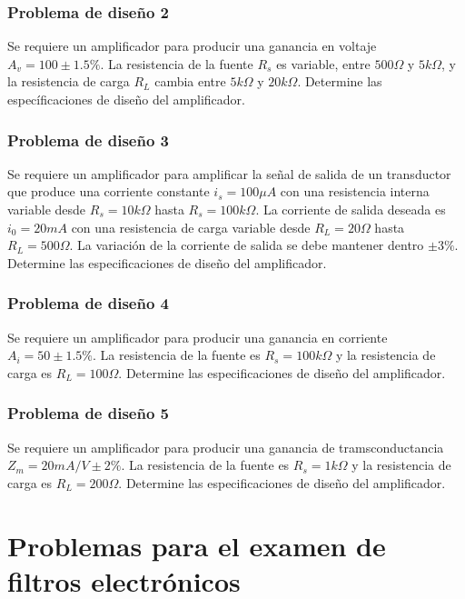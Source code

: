 \documentclass[12pt]{book}
\theoremstyle{definition}
\theoremstyle{remark}
\theoremstyle{plain}
\begin{document}
\subsubsection{Problema de diseño 2}

Se requiere un amplificador para producir una ganancia en voltaje $A_v =100 \pm 1.5 \%$. La resistencia de la fuente $R_s$ es variable, entre $500 \Omega$ y $5 k \Omega$, y la resistencia de carga $R_L$ cambia entre $5 k  \Omega$ y $20 k \Omega$. Determine las específicaciones de diseño del amplificador.

\subsubsection{Problema de diseño 3}

Se requiere un amplificador para amplificar la señal de salida de un transductor que produce una corriente constante $i_s = 100 \mu A$ con una resistencia interna variable desde $R_s=10 k \Omega$ hasta  $R_s=100 k \Omega$. La corriente de salida deseada es $i_0 = 20 mA$ con una resistencia de carga variable desde  $R_L=20 \Omega$ hasta  $R_L=500 \Omega$. La variación de la corriente de salida se debe mantener dentro $\pm 3 \%$. Determine las especificaciones de diseño del amplificador.


\subsubsection{Problema de diseño 4}

Se requiere un amplificador para producir una ganancia en corriente $A_i = 50 \pm 1.5 \%$. La resistencia de la fuente es $R_s=100 k \Omega$ y la resistencia de carga es $R_L= 100 \Omega$. Determine las especificaciones de diseño del amplificador.

\subsubsection{Problema de diseño 5}
Se requiere un amplificador para producir una ganancia de tramsconductancia $Z_m=20 mA/V \pm 2\% $. La resistencia de la fuente es $R_s = 1k \Omega$ y la resistencia de carga es $R_L=200 \Omega$. Determine las especificaciones de diseño del amplificador.

\section{Problemas para el examen de filtros electrónicos}
\end{document}
